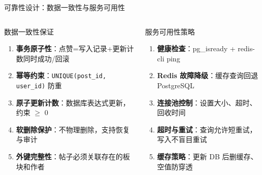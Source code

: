 \documentclass[aspectratio=169,UTF8]{ctexbeamer}
\begin{document}
\begin{frame}{可靠性设计：数据一致性与服务可用性}
    \begin{columns}[T]
        \begin{block}{数据一致性保证}
            \begin{enumerate}
                \item \textbf{事务原子性}：点赞=写入记录+更新计数同时成功/回滚
                \item \textbf{幂等约束}：\texttt{UNIQUE(post\_id, user\_id)} 防重
                \item \textbf{原子更新计数}：数据库表达式更新，约束 $\ge$ 0
                \item \textbf{软删除保护}：不物理删除，支持恢复与审计
                \item \textbf{外键完整性}：帖子必须关联存在的板块和作者
            \end{enumerate}
        \end{block}
        \begin{block}{服务可用性策略}
            \begin{enumerate}
                \item \textbf{健康检查}：pg\_isready + redis-cli ping
                \item \textbf{Redis 故障降级}：缓存查询回退 PostgreSQL
                \item \textbf{连接池控制}：设置大小、超时、回收时间
                \item \textbf{超时与重试}：查询允许短重试，写入不盲目重试
                \item \textbf{缓存策略}：更新 DB 后删缓存、空值防穿透
            \end{enumerate}
        \end{block}
    \end{columns}
\end{frame}
\end{document}
